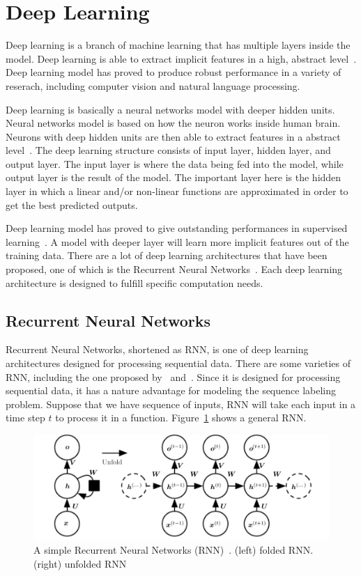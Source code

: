 \section{Deep Learning}
Deep learning is a branch of machine learning that has multiple layers inside the model. Deep learning is able to extract implicit features in a high, abstract level~\citep{lecun2015deep}. Deep learning model has proved to produce robust performance in a variety of reserach, including computer vision and natural language processing.

Deep learning is basically a neural networks model with deeper hidden units. Neural networks model is based on how the neuron works inside human brain. Neurons with deep hidden units are then able to extract features in a abstract level~\citep{bengio2007scaling}. The deep learning structure consists of input layer, hidden layer, and output layer. The input layer is where the data being fed into the model, while output layer is the result of the model. The important layer here is the hidden layer in which a linear and/or non-linear functions are approximated in order to get the best predicted outputs.

Deep learning model has proved to give outstanding performances in supervised learning~\citep{Goodfellow-et-al-2016-Book}. A model with deeper layer will learn more implicit features out of the training data. There are a lot of deep learning architectures that have been proposed, one of which is the Recurrent Neural Networks~\citep{elman1990finding}. Each deep learning architecture is designed to fulfill specific computation needs.

\subsection{Recurrent Neural Networks}
Recurrent Neural Networks, shortened as RNN, is one of deep learning architectures designed for processing sequential data. There are some varieties of RNN, including the one proposed by~\cite{elman1990finding} and~\cite{jordan1986attractor}. Since it is designed for processing sequential data, it has a nature advantage for modeling the sequence labeling problem. Suppose that we have sequence of inputs, RNN will take each input in a time step $t$ to process it in a function. Figure~\ref{fig:simplernn} shows a general RNN.

\begin{figure}
	\centering
	\includegraphics[width=0.80\linewidth]{images/simplernn}
	\caption{A simple Recurrent Neural Networks (RNN)~\citep{Goodfellow-et-al-2016-Book}. (left) folded RNN. (right) unfolded RNN}
	\label{fig:simplernn}
\end{figure}

